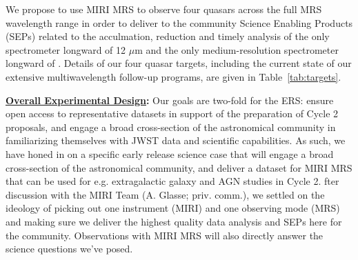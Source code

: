 \smallskip \smallskip
\noindent
We propose to use MIRI MRS to observe four quasars across the full 
MRS wavelength range in order to deliver to the community Science 
Enabling Products (SEPs) related to the acculmation, reduction and 
timely analysis of the only spectrometer longward of 12 $\mu$m 
and the only medium-resolution spectrometer longward of 
. Details of our
four quasar targets, including the current state of our extensive
multiwavelength follow-up programs, are given in
Table~\ref{tab:targets}.


\smallskip \smallskip
\smallskip \smallskip
\noindent
{\bf \underline{Overall Experimental Design}:} 
Our goals are two-fold for the ERS: ensure open access to
representative datasets in support of the preparation of Cycle 2
proposals, and engage a broad cross-section of the astronomical
community in familiarizing themselves with JWST data and scientific
capabilities.  As such, we have honed in on a specific early release
science case that will engage a broad cross-section of the
astronomical community, and deliver a dataset for MIRI MRS that can be
used for e.g. extragalactic galaxy and AGN studies in Cycle 2.  fter
discussion with the MIRI Team (A. Glasse; priv. comm.), we settled on
the ideology of picking out one instrument (MIRI) and one observing
mode (MRS) and making sure we deliver the highest quality data
analysis and SEPs here for the community. Observations with MIRI MRS
will also directly answer the science questions we've posed.


